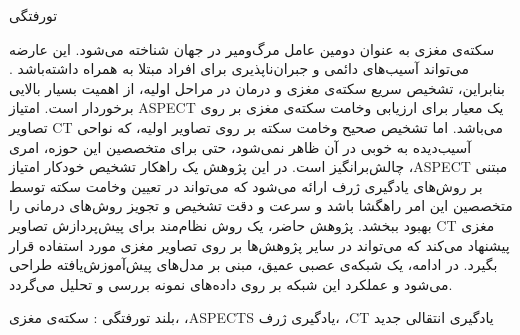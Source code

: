 


‌تورفتگی

سکته‌ی مغزی به عنوان دومین عامل مرگ‌و‌میر در جهان شناخته می‌شود.
این عارضه می‌تواند آسیب‌های دائمی و جبران‌ناپذیری برای افراد مبتلا به همراه داشته‌باشد \cite{donkor2018stroke}.
بنابراین،
تشخیص سریع سکته‌ی مغزی و درمان در مراحل اولیه، از اهمیت بسیار بالایی برخوردار است.
امتیاز ASPECT یک معیار برای ارزیابی وخامت سکته‌ی مغزی بر روی تصاویر CT می‌باشد.
اما تشخیص صحیح وخامت سکته بر روی تصاویر اولیه، که نواحی آسیب‌دیده به خوبی در آن ظاهر نمی‌شود، حتی برای متخصصین این حوزه، امری چالش‌بر‌انگیز است.
 در این پژوهش 
یک راهکار تشخیص خودکار امتیاز ،ASPECT مبتنی بر روش‌های یادگیری ژرف ارائه می‌شود که می‌تواند
 در تعیین وخامت سکته توسط متخصصین این امر راهگشا باشد و سرعت و دقت تشخیص و تجویز روش‌های درمانی را بهبود ببخشد.
پژوهش حاضر، یک روش نظام‌مند برای پیش‌پردازش تصاویر CT مغزی پیشنهاد می‌کند که می‌تواند در سایر پژوهش‌ها بر روی تصاویر مغزی مورد استفاده قرار بگیرد.
در ادامه، یک شبکه‌ی عصبی عمیق، مبنی بر مدل‌های پیش‌آموزش‌یافته طراحی می‌شود و  عملکرد این شبکه بر روی داده‌های نمونه بررسی و تحلیل می‌گردد.

‌بلند
‌تورفتگی : 
سکته‌ی مغزی، ،ASPECTS یادگیری ژرف، ،CT یادگیری انتقالی
‌جدید
